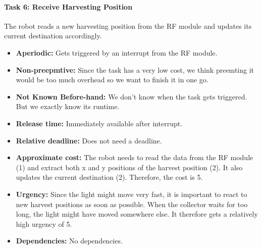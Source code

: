 \documentclass[12pt]{article}
\begin{document}
\paragraph{Task 6: Receive Harvesting Position}   	   		
The robot reads a new harvesting position from the RF module and updates its current destination accordingly.
  \begin{itemize}
	\item \textbf{Aperiodic:} Gets triggered by an interrupt from the RF module.
	\item \textbf{Non-preepmtive:} Since the task has a very low cost, we think preemting it would be too much overhead so we want to finish it in one go.
  	\item \textbf{Not Known Before-hand:} We don't know when the task gets triggered. But we exactly know its runtime.
  	\item \textbf{Release time:} Immediately available after interrupt.
  	\item \textbf{Relative deadline:} Does not need a deadline.
  	\item \textbf{Approximate cost:} The robot needs to read the data from the RF module (1) and extract both x and y positions of the harvest position (2). It also updates the current destination (2). Therefore, the cost is 5.
  	\item \textbf{Urgency:} Since the light might move very fast, it is important to react to new harvest positions as soon as possible. When the collector waits for too long, the light might have moved somewhere else. It therefore gets a relatively high urgency of 5.
  	\item \textbf{Dependencies:} No dependencies.
   	\end{itemize}
\end{document}
